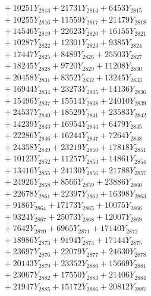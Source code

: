 \documentclass[a4paper,10pt]{article}
\begin{document}
{\begin{align}
&\;  + 10251 Y_{2813} + 21731 Y_{2814} + 6453 Y_{2815} \\[0.3ex]
&\;  + 10255 Y_{2816} + 11559 Y_{2817} + 21479 Y_{2818} \\[0.5ex]\allowbreak
&\;  + 14546 Y_{2819} + 22623 Y_{2820} + 16155 Y_{2821} \\[0.3ex]
&\;  + 10287 Y_{2822} + 12301 Y_{2823} + 9385 Y_{2824} \\[0.3ex]
&\;  + 17447 Y_{2825} + 8489 Y_{2826} + 25503 Y_{2827} \\[0.3ex]
&\;  + 18245 Y_{2828} + 9720 Y_{2829} + 11208 Y_{2830} \\[0.3ex]
&\;  + 20458 Y_{2831} + 8352 Y_{2832} + 13245 Y_{2833} \\[0.3ex]
&\;  + 16944 Y_{2834} + 23273 Y_{2835} + 14136 Y_{2836} \\[0.3ex]
&\;  + 15496 Y_{2837} + 15514 Y_{2838} + 24010 Y_{2839} \\[0.3ex]
&\;  + 24537 Y_{2840} + 18529 Y_{2841} + 23583 Y_{2842} \\[0.3ex]
&\;  + 14239 Y_{2843} + 16954 Y_{2844} + 6479 Y_{2845} \\[0.3ex]
&\;  + 22286 Y_{2846} + 16244 Y_{2847} + 7264 Y_{2848} \\[0.5ex]\allowbreak
&\;  + 24358 Y_{2849} + 23219 Y_{2850} + 17818 Y_{2851} \\[0.3ex]
&\;  + 10123 Y_{2852} + 11257 Y_{2853} + 14861 Y_{2854} \\[0.3ex]
&\;  + 13416 Y_{2855} + 24130 Y_{2856} + 21788 Y_{2857} \\[0.3ex]
&\;  + 24926 Y_{2858} + 8566 Y_{2859} + 23886 Y_{2860} \\[0.3ex]
&\;  + 22678 Y_{2861} + 22397 Y_{2862} + 16398 Y_{2863} \\[0.3ex]
&\;  + 9186 Y_{2864} + 17173 Y_{2865} + 10075 Y_{2866} \\[0.3ex]
&\;  + 9324 Y_{2867} + 25073 Y_{2868} + 12007 Y_{2869} \\[0.3ex]
&\;  + 7642 Y_{2870} + 6965 Y_{2871} + 17140 Y_{2872} \\[0.3ex]
&\;  + 18986 Y_{2873} + 9194 Y_{2874} + 17144 Y_{2875} \\[0.3ex]
&\;  + 23697 Y_{2876} + 22079 Y_{2877} + 24630 Y_{2878} \\[0.5ex]\allowbreak
&\;  + 20143 Y_{2879} + 23352 Y_{2880} + 15669 Y_{2881} \\[0.3ex]
&\;  + 23067 Y_{2882} + 17550 Y_{2883} + 21406 Y_{2884} \\[0.3ex]
&\;  + 21947 Y_{2885} + 15172 Y_{2886} + 20812 Y_{2887} \\[0.3ex]

\end{align}}
\end{document}
